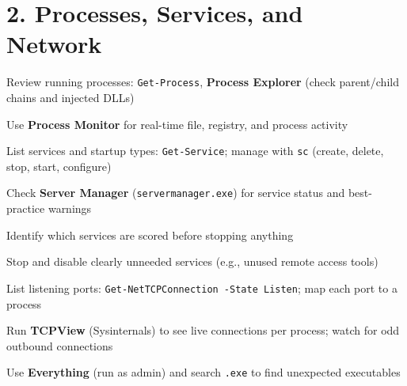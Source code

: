 \documentclass[11pt]{article}
\newcommand{\cmd}[1]{\texttt{\small #1}}
\begin{document}
\section*{2. Processes, Services, and Network}
\begin{mycheck}
  \item Review running processes: \cmd{Get-Process}, \textbf{Process Explorer} (check parent/child chains and injected DLLs)
  \item Use \textbf{Process Monitor} for real-time file, registry, and process activity
  \item List services and startup types: \cmd{Get-Service}; manage with \cmd{sc} (create, delete, stop, start, configure)
  \item Check \textbf{Server Manager} (\cmd{servermanager.exe}) for service status and best-practice warnings
  \item Identify which services are scored before stopping anything
  \item Stop and disable clearly unneeded services (e.g., unused remote access tools)
  \item List listening ports: \cmd{Get-NetTCPConnection -State Listen}; map each port to a process
  \item Run \textbf{TCPView} (Sysinternals) to see live connections per process; watch for odd outbound connections
  \item Use \textbf{Everything} (run as admin) and search \cmd{*.exe} to find unexpected executables
\end{mycheck}
\end{document}
